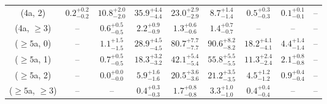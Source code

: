 \begin{table}[h!]
{\begin{tabular}{ccccccccc}
	(4a, 2) & $0.2^{+ 0.2 }_{- 0.2 }$ & $10.8^{+ 2.0 }_{- 2.0 }$ & $35.9^{+ 4.4 }_{- 4.4 }$ & $23.0^{+ 2.9 }_{- 2.9 }$ & $8.7^{+ 1.4 }_{- 1.4 }$ & $0.5^{+ 0.3 }_{- 0.3 }$ & $0.1^{+ 0.1 }_{- 0.1 }$ & -- \\[0.5ex] 
	(4a, $\ge3$) & -- & $0.6^{+ 0.5 }_{- 0.5 }$ & $2.2^{+ 0.9 }_{- 0.9 }$ & $1.3^{+ 0.6 }_{- 0.6 }$ & $1.4^{+ 0.7 }_{- 0.7 }$ & -- & -- & -- \\[0.5ex] 
	($\ge5$a, 0) & -- & $1.1^{+ 1.5 }_{- 1.5 }$ & $28.9^{+ 4.5 }_{- 4.5 }$ & $80.7^{+ 7.7 }_{- 7.7 }$ & $90.6^{+ 8.2 }_{- 8.2 }$ & $18.2^{+ 4.1 }_{- 4.1 }$ & $4.4^{+ 1.4 }_{- 1.4 }$ & -- \\[0.5ex] 
	($\ge5$a, 1) & -- & $0.7^{+ 0.5 }_{- 0.5 }$ & $18.3^{+ 3.2 }_{- 3.2 }$ & $42.1^{+ 5.4 }_{- 5.4 }$ & $55.8^{+ 5.5 }_{- 5.5 }$ & $11.3^{+ 2.4 }_{- 2.4 }$ & $2.1^{+ 0.8 }_{- 0.8 }$ & -- \\[0.5ex] 
	($\ge5$a, 2) & -- & $0.0^{+ 0.0 }_{- 0.0 }$ & $5.9^{+ 1.6 }_{- 1.6 }$ & $20.5^{+ 3.6 }_{- 3.6 }$ & $21.2^{+ 3.5 }_{- 3.5 }$ & $4.5^{+ 1.2 }_{- 1.2 }$ & $0.9^{+ 0.4 }_{- 0.4 }$ & -- \\[0.5ex] 
	($\ge5$a, $\ge3$) & -- & -- & $0.4^{+ 0.3 }_{- 0.3 }$ & $1.7^{+ 0.8 }_{- 0.8 }$ & $3.3^{+ 1.0 }_{- 1.0 }$ & $0.4^{+ 0.4 }_{- 0.4 }$ & -- & -- \\[0.5ex] 
	\hline
	\hline
\end{tabular}}
\end{table}
